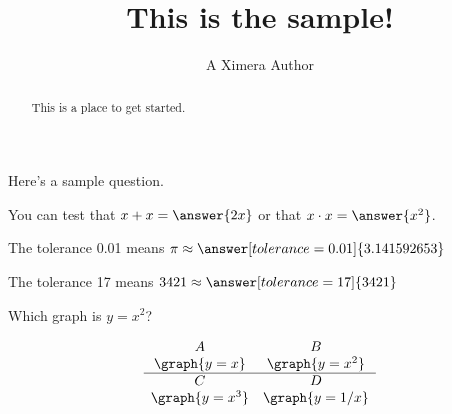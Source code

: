 \documentclass{ximera}
\begin{document}
\title{This is the sample!}
\author{A Ximera Author}
\begin{abstract}
  This is a place to get started.
\end{abstract}

\maketitle

Here's a sample question.

\begin{problem}
\begin{multipleChoice}
\end{multipleChoice}
\end{problem}

\begin{problem}
   You can test that $x + x = \answer{2x}$ or that $x \cdot x = \answer{x^2}$.
\end{problem}

\begin{problem}
   The tolerance 0.01 means $\pi \approx \answer[tolerance=0.01]{3.141592653}$
\end{problem}

\begin{problem}
   The tolerance 17 means $3421 \approx \answer[tolerance=17]{3421}$
\end{problem}

\begin{problem}
    Which graph is $y=x^2$?

\[
\begin{array}{cc}
A & B \\
\graph{y=x} & \graph{y=x^2} \\ \hline
C & D \\
\graph{y=x^3} &\graph{y=1/x} \\
\end{array}
\]

\begin{multipleChoice}
\end{multipleChoice}
\end{problem}
\end{document}
